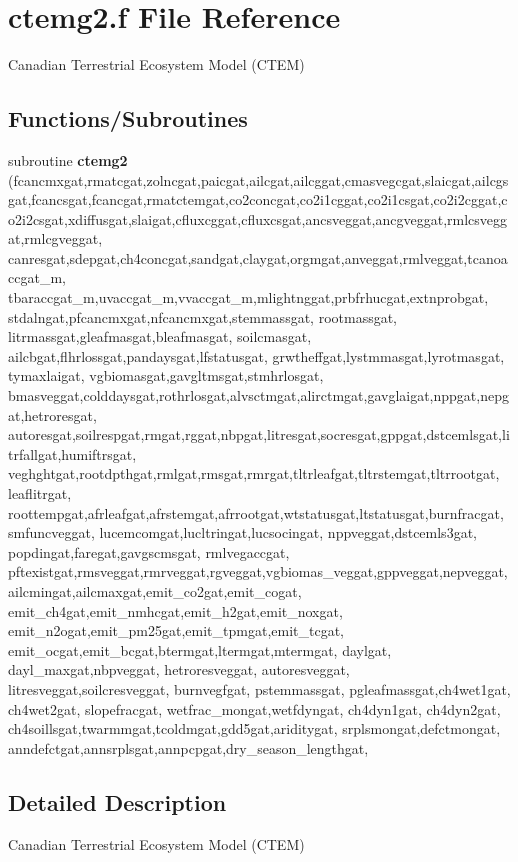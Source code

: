 \hypertarget{ctemg2_8f}{}\section{ctemg2.\+f File Reference}
\label{ctemg2_8f}


Canadian Terrestrial Ecosystem Model (C\+T\+E\+M)  


\subsection*{Functions/\+Subroutines}
\begin{DoxyCompactItemize}
\item 
\hypertarget{ctemg2_8f_a2bd4e0c942675972e99b6c40c22fa22d}{}subroutine {\bfseries ctemg2} (fcancmxgat,rmatcgat,zolncgat,paicgat,ailcgat,ailcggat,cmasvegcgat,slaicgat,ailcgsgat,fcancsgat,fcancgat,rmatctemgat,co2concgat,co2i1cggat,co2i1csgat,co2i2cggat,co2i2csgat,xdiffusgat,slaigat,cfluxcggat,cfluxcsgat,ancsveggat,ancgveggat,rmlcsveggat,rmlcgveggat, canresgat,sdepgat,ch4concgat,sandgat,claygat,orgmgat,anveggat,rmlveggat,tcanoaccgat\+\_\+m, tbaraccgat\+\_\+m,uvaccgat\+\_\+m,vvaccgat\+\_\+m,mlightnggat,prbfrhucgat,extnprobgat, stdalngat,pfcancmxgat,nfcancmxgat,stemmassgat, rootmassgat, litrmassgat,gleafmasgat,bleafmasgat, soilcmasgat, ailcbgat,flhrlossgat,pandaysgat,lfstatusgat, grwtheffgat,lystmmasgat,lyrotmasgat, tymaxlaigat, vgbiomasgat,gavgltmsgat,stmhrlosgat, bmasveggat,colddaysgat,rothrlosgat,alvsctmgat,alirctmgat,gavglaigat,nppgat,nepgat,hetroresgat, autoresgat,soilrespgat,rmgat,rggat,nbpgat,litresgat,socresgat,gppgat,dstcemlsgat,litrfallgat,humiftrsgat, veghghtgat,rootdpthgat,rmlgat,rmsgat,rmrgat,tltrleafgat,tltrstemgat,tltrrootgat, leaflitrgat, roottempgat,afrleafgat,afrstemgat,afrrootgat,wtstatusgat,ltstatusgat,burnfracgat, smfuncveggat, lucemcomgat,lucltringat,lucsocingat, nppveggat,dstcemls3gat, popdingat,faregat,gavgscmsgat, rmlvegaccgat, pftexistgat,rmsveggat,rmrveggat,rgveggat,vgbiomas\+\_\+veggat,gppveggat,nepveggat,ailcmingat,ailcmaxgat,emit\+\_\+co2gat,emit\+\_\+cogat, emit\+\_\+ch4gat,emit\+\_\+nmhcgat,emit\+\_\+h2gat,emit\+\_\+noxgat, emit\+\_\+n2ogat,emit\+\_\+pm25gat,emit\+\_\+tpmgat,emit\+\_\+tcgat, emit\+\_\+ocgat,emit\+\_\+bcgat,btermgat,ltermgat,mtermgat, daylgat, dayl\+\_\+maxgat,nbpveggat, hetroresveggat, autoresveggat, litresveggat,soilcresveggat, burnvegfgat, pstemmassgat, pgleafmassgat,ch4wet1gat, ch4wet2gat, slopefracgat, wetfrac\+\_\+mongat,wetfdyngat, ch4dyn1gat, ch4dyn2gat, ch4soillsgat,twarmmgat,tcoldmgat,gdd5gat,ariditygat, srplsmongat,defctmongat, anndefctgat,annsrplsgat,annpcpgat,dry\+\_\+season\+\_\+lengthgat,\label{ctemg2_8f_a2bd4e0c942675972e99b6c40c22fa22d}

\end{DoxyCompactItemize}


\subsection{Detailed Description}
Canadian Terrestrial Ecosystem Model (C\+T\+E\+M) 

